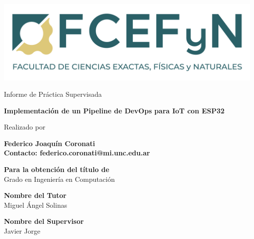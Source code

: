 \begin{center}

    \vspace*{1cm}
    
    \includegraphics[width=\textwidth]{fig/FCEFyN-Duotono_tagline.png}
    
    \vspace*{2cm}
    \begin{large}
    Informe de Práctica Supervisada
    \end{large}
    
    \vspace*{0.1in}
    \textbf{\huge Implementación de un Pipeline de DevOps para IoT con ESP32} %
    
    \vspace*{.2in}
    
    {\large Realizado por}\\
    \vspace*{.2in}
    
    \textbf{\Large Federico Joaquín Coronati}\\ %
    \textbf{Contacto: federico.coronati@mi.unc.edu.ar} %
    
    \vspace*{3cm}
    
    \textbf{Para la obtención del título de}\\
    {\large Grado en Ingeniería en Computación} %
    
    \vspace*{0.2in}
    
    \textbf{Nombre del Tutor}\\
    {\large Miguel Ángel Solinas}\\ %
    
    \vspace*{0.2in}
    
    \textbf{Nombre del Supervisor}\\
    {\large Javier Jorge}
    

\end{center}


\thispagestyle{empty} %
\clearpage\setcounter{page}{1} %

